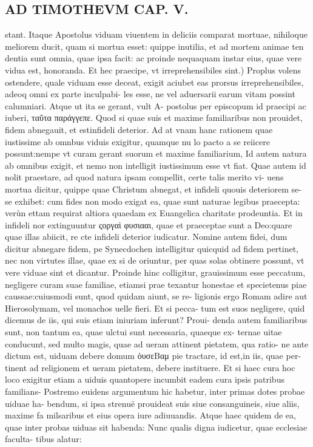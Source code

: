 \documentclass{article}
\begin{document}
\begin{pages}
\section*{AD TIMOTHEVM CAP. V. }
\marginpar{[ p.107 ]}\pstart stant. Itaque Apostolus viduam viuentem in deliciis comparat mortuae, nihiloque meliorem ducit, quam si mortua esset: quippe inutilia, et ad mortem animae ten dentia sunt omnia, quae ipsa facit: ac proinde nequaquam instar eius, quae vere vidua est, honoranda.  \pend\pstart Et hec praecipe, vt irreprehensibiles sint.) Proplus volens ostendere, quale viduam esse deceat, exigit aciubet eas prorsus irreprehensibiles, adeoq omni ex parte inculpabi- les esse, ne vel aduersarii earum vitam possint calumniari. Atque ut ita se gerant, vult A- postolus per episcopum id praecipi ac iuberi, ταῦτα παράγγεπε.  \pend\pstart Quod si quae suis et maxime familiaribus non prouidet, fidem abnegauit, et estinfideli deterior. Ad at vnam hanc rationem quae iustissime ab omnbus viduis exigitur, quamque nu lo pacto a se reiicere possunt:nempe vt curam gerant suorum et maxime familiarium, Id autem natura ab omnibus exigit, et nemo non intelligit iustissimum esse vt fiat. Quae autem id nolit praestare, ad quod natura ipsam compellit, certe talis merito vi- uens mortua dicitur, quippe quae Christum abnegat, et infideli quouis deteriorem se- se exhibet: cum fides non modo exigat ea, quae sunt naturae legibus praecepta: verùn ettam requirat altiora quaedam ex Euangelica charitate prodeuntia. Et in infideli nor extinguuntur ςοργαὶ φυσιααι, quae et praeceptae sunt a Deo:quare quae illas abiicit, re cte infideli deterior iudicatur. Nomine autem fidei, dum dicitur abnegare fidem, pe Synecdochen intelligitur quicquid ad fidem pertinet, nec non virtutes illae, quae ex si de oriuntur, per quas solas obtinere possunt, vt vere viduae sint et dicantur. Proinde hinc colligitur, grauissimum esse peccatum, negligere curam suae familiae, etiamsi prae texantur honestae et specietenus piae caussae:cuiusmodi sunt, quod quidam aiunt, se re- ligionis ergo Romam adire aut Hierosolymam, vel monachos uelle fieri. Et si pecca- tum est suos negligere, quid dicemus de iis, qui suis etiam iniuriam inferunt? Proui- denda autem familiaribus sunt, non tantum ea, quae ulctui sunt necessaria, quaeque ex- ternae uitae conducunt, sed multo magis, quae ad ueram attinent pietatem, qua ratio- ne ante dictum est, uiduam debere domum ὁυσεBαμ pie tractare, id est,in iis, quae per- tinent ad religionem et ueram pietatem, debere instituere. Et si haec cura hoc loco exigitur etiam a uiduis quantopere incumbit eadem cura ipsis patribus familians- Postremo euidens argumentum hic habetur, inter primas dotes probae uiduae ha- bendum, si ipsa strenuë prouideat suis siue consanguineis, siue aliis, maxime fa milsaribus et eius opera iure adiuuandis. Atque haec quidem de ea, quae inter probas uiduas sit habenda: Nunc qualis digna iudicetur, quae ecclesiae faculta- tibus alatur:  \pend
{}
{}

\end{pages}
\end{document}
